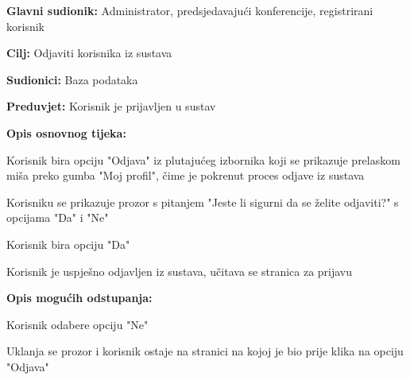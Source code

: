 					\noindent {}
					\begin{packed_item}
						
						\item \textbf{Glavni sudionik: } Administrator, predsjedavajući konferencije, registrirani korisnik
						\item  \textbf{Cilj:} Odjaviti korisnika iz sustava
						\item  \textbf{Sudionici:} Baza podataka
						\item  \textbf{Preduvjet:} Korisnik je prijavljen u sustav
						\item  \textbf{Opis osnovnog tijeka:}
						
						\item[] \begin{packed_enum}
							
							\item Korisnik bira opciju "Odjava" iz plutajućeg izbornika koji se prikazuje prelaskom miša preko gumba "Moj profil", čime je pokrenut proces odjave iz sustava
							\item Korisniku se prikazuje prozor s pitanjem "Jeste li sigurni da se želite odjaviti?" s opcijama "Da" i "Ne"
							\item Korisnik bira opciju "Da"
							\item Korisnik je uspješno odjavljen iz sustava, učitava se stranica za prijavu
							
						\end{packed_enum}

						\item \textbf{Opis mogućih odstupanja:}
						\item[] \begin{packed_enum}

							\item[3.a] Korisnik odabere opciju "Ne"
							\item[] \begin{packed_enum}
								\item[1.] Uklanja se prozor i korisnik ostaje na stranici na kojoj je bio prije klika na opciju "Odjava"
							\end{packed_enum}
						\end{packed_enum}
						
					\end{packed_item}


